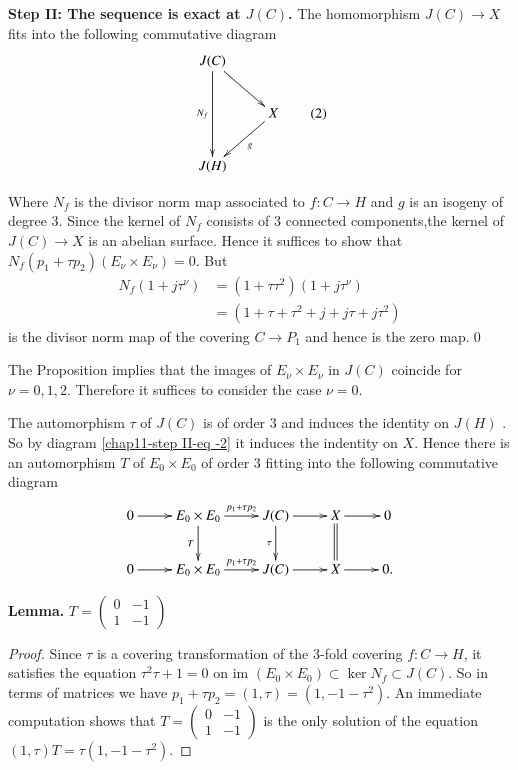 \medskip
\noindent
{\bfseries Step II: The sequence is exact at $J(C)$.} The homomorphism $J(C) \rightarrow X $ fits into the following commutative diagram
\begin{equation*}\label{chap11-step II-eq -2}
\vcenter{
\xymatrix{
J(C)\ar[dr]\ar[dd]_-{N_{f}} & \\
    &X \ar[dl]^-{g}\\
J(H)  &     
}}\tag{2}
\end{equation*}

Where $N_{f}$ is the divisor norm map associated to $f: C\rightarrow H$ and $g$ is an isogeny of degree 3. Since the kernel of $N_{f}$ consists of 3 connected components,the kernel of $J(C)\rightarrow X$ is an abelian surface. Hence it suffices to show that $N_{f}(p_{1} + \tau p_{2})(E_{\nu} \times E_{\nu})=0$. But
\begin{align*}
N_{f}(1 + j\tau^{\nu})&= (1 +\tau \tau^{2})(1 + j\tau^{\nu})\\
                      &=(1+ \tau + \tau^{2} + j + j\tau + j\tau^{2})
\end{align*}
is the divisor norm map of the covering $C\rightarrow P_{1}$ and hence is the zero map.\qed

The Proposition implies that the images of $E_{\nu} \times E_{\nu}$ in $J(C)$ coincide for $\nu =0,1,2$. Therefore it suffices to consider the case $\nu=0$.

The automorphism $\tau$ of $J(C)$ is of order 3 and induces the identity on $J(H)$ . So by diagram \eqref{chap11-step II-eq -2} it induces the indentity on $X$. Hence there is an automorphism $T$ of $ E_{0} \times E_{0}$ of order 3 fitting into the following commutative diagram
$$
\xymatrix{
0 \ar[r] & E_{0}\times E_{0} \ar[d]_-{T} \ar[r]^-{p_{1}+\tau p_{2}}& J(C)\ar[d]_-{\tau}\ar[r] & X\ar@{=}[d] \ar[r] & 0\\
0 \ar[r] &E_{0}\times E_{0}  \ar[r]^-{p_{1}+\tau p_{2}} & J(C)\ar[r] & X \ar[r] & 0.
}
$$ 

\medskip
\noindent
{\bfseries {} Lemma.\label{chap11-lemma-5.3}}
$T=\begin{pmatrix}
0 & -1\\
1 & -1
\end{pmatrix}
$\pageoriginale

\begin{proof}
Since $\tau$ is a covering transformation of the 3-fold covering $f: C\rightarrow H$, it satisfies the equation $\tau^{2} \tau + 1 =0$ on im $(E_{0}\times E_{0})\subset \ker N_{f} \subset J(C)$. So in terms of matrices we have $p_{1} + \tau p_{2} = (1, \tau)=(1,-1-\tau^{2})$. An immediate computation shows that
$T = \begin{pmatrix}
0 & -1\\
1 & -1
\end{pmatrix}
$ is the only solution of the equation $(1,\tau)T=\tau(1,-1-\tau^{2})$.
\end{proof}

